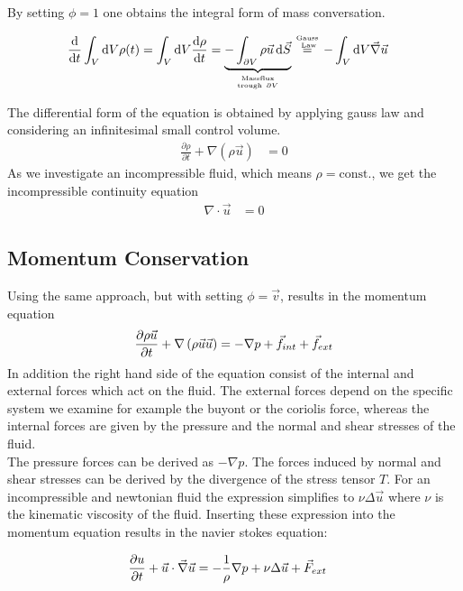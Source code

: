 By setting $\phi = 1$ one obtains the integral form of mass conversation.

\begin{align}
    \frac{\dif}{\dif t} \int_{V}\dif V \rho(t) =  \int_{V}\dif V \frac{\dif \rho}{\dif t}  &= \underbrace{-\int_{\partial V}
     \rho \vec{u}\dif \vec{S}}_{\mathrm{Massflux} \atop \mathrm{trough \ } \partial V} \stackrel{\text{Gauss} \atop \text{ Law}}{=} -\int_V \dif V \vec{\nabla}\vec{u}
\end{align}

The differential form of the equation is obtained by applying gauss law and considering an infinitesimal small control volume.
\begin{align}
     \frac{\partial \rho}{\partial t}  + \nabla(\rho \vec{u}) &= 0
\end{align}
As we investigate an incompressible fluid, which means $\rho = \text{const.}$, we get the incompressible continuity equation
\begin{align}
     \nabla \cdot \vec{u} &= 0
\end{align}


\subsection{Momentum Conservation}

Using the same approach, but with setting $\phi = \vec{v}$, results in the momentum equation
\begin{align}
    \pdn[\rho \vec{u}]{t} + \nabla\left(\rho\vec{u}\vec{u}\right) =  -\nabla p  + \vec{f}_{int} + \vec{f}_{ext}
\end{align}
In addition the right hand side of the equation consist of the internal and external forces which act on the fluid.
The external forces depend on the specific system  we examine for example the buyont or the coriolis force, whereas the internal forces
are given by the pressure and the normal and shear stresses of the fluid.\\
The pressure forces can be derived as $- \nabla p$.
The forces induced by normal and shear stresses can be derived by the divergence of the stress tensor $T$.
For an incompressible and newtonian fluid the expression simplifies to $\nu \Delta \vec{u}$ where $\nu$ is the kinematic viscosity of the fluid.
Inserting these expression into the momentum equation results in the navier stokes equation:

\begin{align}
    \pdn[u]{t} + \vec{u} \cdot \vec{\nabla} \vec{u} &= - \frac{1}{\rho} \nabla p + \nu \Delta \vec{u} + \vec{F}_{ext}
\end{align}


